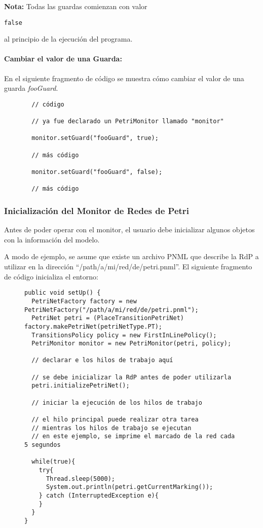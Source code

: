 \begin{framed}
\textbf{Nota:} Todas las guardas comienzan con valor {
\begin{verbatim}
false
\end{verbatim}
} al
principio de la ejecución del programa.
\end{framed}

\paragraph{Cambiar el valor de una Guarda:} En el siguiente fragmento de código
se muestra cómo cambiar el valor de una guarda \textit{fooGuard}.

\begin{figure}[H]
\centering
\begin{verbatim}
  // código
  
  // ya fue declarado un PetriMonitor llamado "monitor"
  
  monitor.setGuard("fooGuard", true);
  
  // más código
  
  monitor.setGuard("fooGuard", false);
  
  // más código
\end{verbatim}
\end{figure}

\subsubsection{Inicialización del Monitor de Redes de Petri}

Antes de poder operar con el monitor, el usuario debe inicializar algunos
objetos con la información del modelo.

A modo de ejemplo, se asume que existe un archivo PNML que describe la RdP a
utilizar en la dirección ``/path/a/mi/red/de/petri.pnml''. El siguiente
fragmento de código inicializa  el entorno:

\begin{figure}[H]
\centering
\begin{verbatim}
public void setUp() {
  PetriNetFactory factory = new PetriNetFactory("/path/a/mi/red/de/petri.pnml");
  PetriNet petri = (PlaceTransitionPetriNet) factory.makePetriNet(petriNetType.PT);
  TransitionsPolicy policy = new FirstInLinePolicy();
  PetriMonitor monitor = new PetriMonitor(petri, policy);
  
  // declarar e los hilos de trabajo aquí
  
  // se debe inicializar la RdP antes de poder utilizarla
  petri.initializePetriNet();
  
  // iniciar la ejecución de los hilos de trabajo
  
  // el hilo principal puede realizar otra tarea
  // mientras los hilos de trabajo se ejecutan
  // en este ejemplo, se imprime el marcado de la red cada 5 segundos
  
  while(true){
    try{
      Thread.sleep(5000);
      System.out.println(petri.getCurrentMarking());
    } catch (InterruptedException e){
    }
  }
}
\end{verbatim}
\end{figure}

